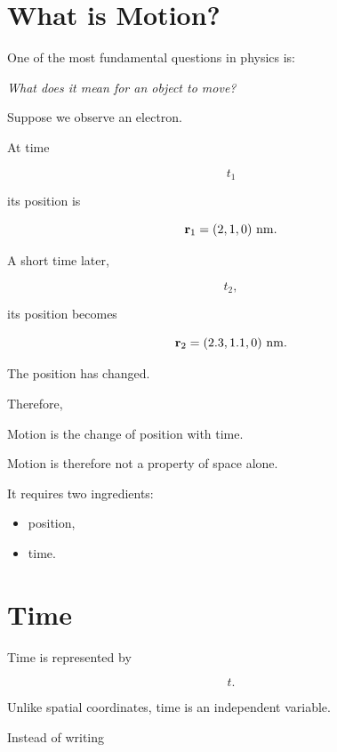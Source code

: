 \documentclass[11pt,a4paper,openany]{book}
\begin{document}
\newpage


\section{What is Motion?}

One of the most fundamental questions in physics is:

\begin{center}
	\emph{What does it mean for an object to move?}
\end{center}

Suppose we observe an electron.

At time

\[
t_1
\]

its position is

\[
\mathbf r_1
=
(2,1,0)\ {\rm nm}.
\]

A short time later,

\[
t_2,
\]

its position becomes

\[
\mathbf r_2
=
(2.3,1.1,0)\ {\rm nm}.
\]

The position has changed.

Therefore,

\begin{keyidea}
Motion is the change of position with time.
\end{keyidea}

Motion is therefore not a property of space alone.

It requires two ingredients:

\begin{itemize}
	\item position,
	\item time.
\end{itemize}


\section{Time}

Time is represented by

\[
t.
\]

Unlike spatial coordinates, time is an independent variable.

Instead of writing
\end{document}
